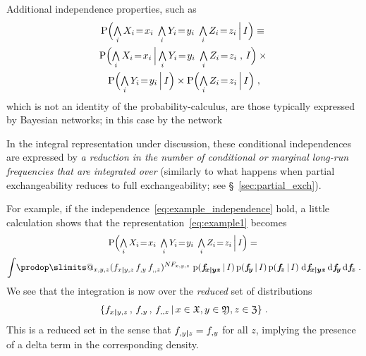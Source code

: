 \documentclass[\ifafour a4paper,12pt,\else a5paper,10pt,\fi%
onecolumn,oneside,article,%
british%
]{memoir}
\makeatletter
\theoremstyle{remark}
\theoremstyle{innote}
\def\prod{\DOTSI\prodop\slimits@}
\newcommand*{\di}{\mathrm{d}}%
\newcommand*{\Land}{\mathop{\textstyle\bigwedge}}
\DeclarePairedDelimiter\set{\{}{\}}
\newcommand*{\pf}{\mathrm{p}}%
\newcommand*{\p}{\mathrm{P}}%
\renewcommand*{\|}[1][]{\nonscript\,#1\vert\nonscript\,\mathopen{}}
\newcommand*{\sect}{\S}%
\renewcommand*{\=}{\TextOrMath\texteq\eq}
\newcommand*{\X}[1]{X_{#1}}
\newcommand*{\x}[1]{x_{#1}}
\newcommand*{\A}[1]{A_{#1}}
\newcommand*{\B}[1]{B_{#1}}
\newcommand*{\Y}[1]{Y_{#1}}
\newcommand*{\y}[1]{y_{#1}}
\newcommand*{\Z}[1]{Z_{#1}}
\newcommand*{\z}[1]{z_{#1}}
\newcommand*{\sx}{\mathfrak{X}}
\newcommand*{\sy}{\mathfrak{Y}}
\newcommand*{\sz}{\mathfrak{Z}}
\newcommand*{\ff}[1]{f_{#1}}
\newcommand*{\ffb}[1]{\bm{f_{\!#1}}}
\newcommand*{\FF}[1]{F_{#1}}
\newcommand*{\bcond}[1][]{\nonscript\,#1\bm{\vert}\nonscript\;\mathopen{}}
\makeatother
\begin{document}
Additional independence properties, such as
\begin{multline}
  \label{eq:example_independence}
  \p\Bigl( \Land_{i}\X{i}\=\x{i} \;  \Land_{i}\Y{i}\=\y{i} \;
  \Land_{i}\Z{i}\=\z{i} \|[\Big] I\Bigr)  \equiv{}\\
  \p\Bigl( \Land_{i}\X{i}\=\x{i} \|[\Big]  \Land_{i}\Y{i}\=\y{i} \;
  \Land_{i}\Z{i}\=\z{i}\;,\,  I\Bigr) \times{}\\
  \p\Bigl( \Land_{i}\Y{i}\=\y{i} \|[\Big] I\Bigr) \times
  \p\Bigl( \Land_{i}\Z{i}\=\z{i} \|[\Big]  I\Bigr)
  \;,
\end{multline}
which is not an identity of the probability-calculus, are those typically
expressed by Bayesian networks; 
in this case by the network


In the integral representation under discussion, these conditional
independences are expressed by \emph{a reduction in the number of
  conditional or marginal long-run frequencies that are integrated over}
(similarly to what happens when partial exchangeability reduces to full
exchangeability; see \sect~\ref{sec:partial_exch}).

For example, if the independence~\eqref{eq:example_independence} hold, a
little calculation shows that the representation~\eqref{eq:example1} becomes
\begin{multline}
  \label{eq:example1sep}
\p\Bigl( \Land_{i}\X{i}\=\x{i} \;  \Land_{i}\Y{i}\=\y{i} \;
\Land_{i}\Z{i}\=\z{i} \|[\Big] I\Bigr)
   ={}\\
     \int\!\prod_{x,y,z}
     (\ff{x \bcond y,z}\, \ff{,y}\, \ff{,,z})^{N \FF{x,y,z}}\;%
\pf(\ffb{x \bcond y z}\|I)\,\pf(\ffb{y}\|I)\,\pf(\ffb{z}\|I)
\;\di\ffb{x \bcond y z} \,\di\ffb{y} \,\di\ffb{z} \;.
\end{multline}
We see that the integration is now over the \emph{reduced} set of
distributions
\begin{equation}
  \label{eq:subset_freqs}
  \set{\ff{x \bcond y,z} \,,\, \ff{,y} \,,\, \ff{,,z} \|
    x \in \sx, y \in \sy, z \in \sz} \;.
\end{equation}
This is a reduced set in the sense that $\ff{,y \bcond z} = \ff{,y}$ for
all $z$, implying the presence of a delta term in the corresponding
density.
\end{document}
